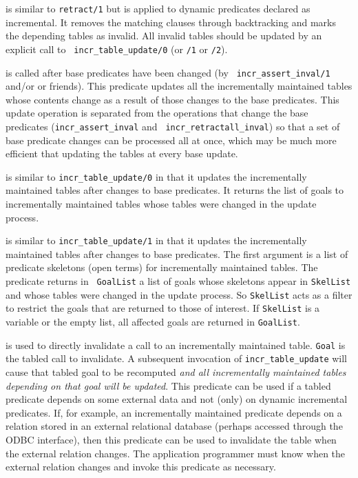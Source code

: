 \begin{description}
is similar to {\tt retract/1} but is applied to dynamic predicates
declared as incremental.  It removes the matching clauses through
backtracking and marks the depending tables as invalid.  All invalid
tables should be updated by an explicit call to {\tt
  incr\_table\_update/0} (or {\tt /1} or {\tt /2}).

is called after base predicates have been changed (by {\tt
incr\_assert\_inval/1} and/or  or
friends).  This predicate updates all the incrementally maintained
tables whose contents change as a result of those changes to the base
predicates.  This update operation is separated from the operations
that change the base predicates ({\tt incr\_assert\_inval} and {\tt
incr\_retractall\_inval}) so that a set of base predicate changes can be
processed all at once, which may be much more efficient that updating
the tables at every base update.

is similar to {\tt incr\_table\_update/0} in that it updates the
incrementally maintained tables after changes to base predicates.  It
returns the list of goals to incrementally maintained tables whose
tables were changed in the update process.

is similar to {\tt incr\_table\_update/1} in that it updates the
incrementally maintained tables after changes to base predicates.  The
first argument is a list of predicate skeletons (open terms) for
incrementally maintained tables.  The predicate returns in {\tt
GoalList} a list of goals whose skeletons appear in {\tt SkelList} and
whose tables were changed in the update process.  So {\tt SkelList}
acts as a filter to restrict the goals that are returned to those of
interest.  If {\tt SkelList} is a variable or the empty list, all
affected goals are returned in {\tt GoalList}.

is used to directly invalidate a call to an incrementally maintained
table.  {\tt Goal} is the tabled call to invalidate.  A subsequent
invocation of {\tt incr\_table\_update} will cause that tabled goal to
be recomputed {\em and all incrementally maintained tables depending
  on that goal will be updated}.  This predicate can be used if a
tabled predicate depends on some external data and not (only) on
dynamic incremental predicates.  If, for example, an incrementally
maintained predicate depends on a relation stored in an external
relational database (perhaps accessed through the ODBC interface),
then this predicate can be used to invalidate the table when the
external relation changes.  The application programmer must know when
the external relation changes and invoke this predicate as necessary.


\end{description}
